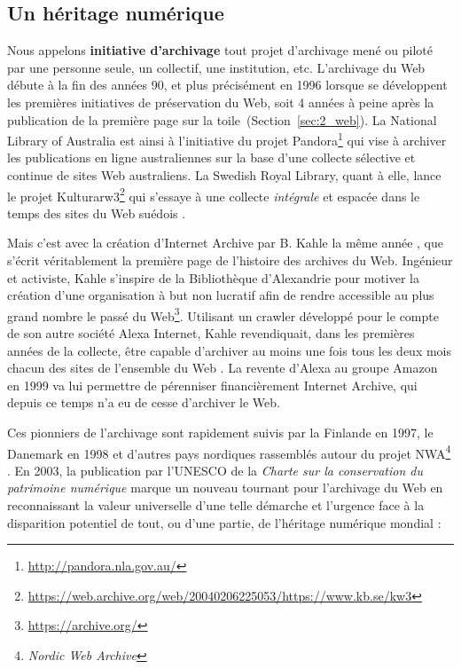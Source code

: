 \documentclass[symmetric,justified,marginals=raggedouter]{tufte-book}
\begin{document}
\subsection{Un héritage numérique}

\noindent Nous appelons \textbf{initiative d'archivage} tout projet d'archivage mené ou piloté par une personne seule, un collectif, une institution, etc. L'archivage du Web débute à la fin des années 90, et plus précisément en 1996 lorsque se développent les premières initiatives de préservation du Web, soit 4 années à peine après la publication de la première page sur la toile~(Section~\ref{sec:2_web}). La National Library of Australia est ainsi à l'initiative du projet Pandora\footnote{\RaggedOuter \url{http://pandora.nla.gov.au/}} qui vise à archiver les publications en ligne australiennes sur la base d'une collecte sélective et continue de sites Web australiens. La Swedish Royal Library, quant à elle, lance le projet Kulturarw3\footnote{\RaggedOuter \url{https://web.archive.org/web/20040206225053/https://www.kb.se/kw3}} qui s'essaye à une collecte \textit{intégrale} et espacée dans le temps des sites du Web suédois \citep{arvidson_kulturarw3_2000}.

Mais c'est avec la création d'Internet Archive par B. Kahle la même année \citep{kahle_preserving_1997}, que s'écrit véritablement la première page de l'histoire des archives du Web. Ingénieur et activiste, Kahle s'inspire de la Bibliothèque d'Alexandrie pour motiver la création d'une organisation à but non lucratif afin de rendre accessible au plus grand nombre le passé du Web\footnote{\RaggedOuter \url{https://archive.org/}}. Utilisant un crawler développé pour le compte de son autre société Alexa Internet, Kahle revendiquait, dans les premières années de la collecte, être capable d'archiver au moins une fois tous les deux mois chacun des sites de l'ensemble du Web \citep{mohr_introduction_2004}. La revente d'Alexa au groupe Amazon en 1999 va lui permettre de pérenniser financièrement Internet Archive, qui depuis ce temps n'a eu de cesse d'archiver le Web.

Ces pionniers de l'archivage sont rapidement suivis par la Finlande en 1997, le Danemark en 1998 et d'autres pays nordiques rassemblés autour du projet NWA\footnote{\RaggedOuter \textit{Nordic Web Archive}} \citep{hallgrinsson_nordic_2003}. En 2003, la publication par l'UNESCO de la \textit{Charte sur la conservation du patrimoine numérique} \citep{unesco_charter_2003} marque un nouveau tournant pour l'archivage du Web en reconnaissant la valeur universelle d'une telle démarche et l'urgence face à la disparition potentiel de tout, ou d'une partie, de l'héritage numérique mondial : \\
\end{document}

